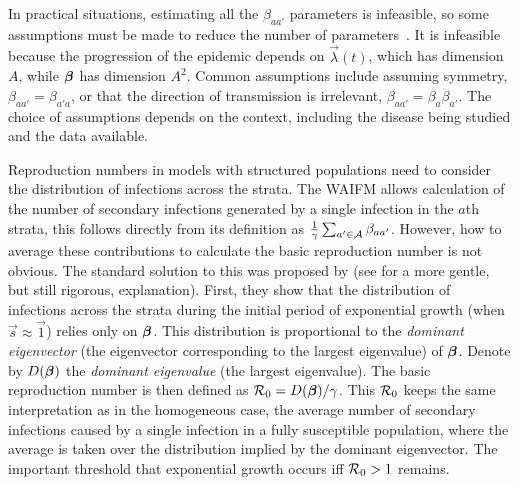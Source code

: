 \documentclass[thesis.tex]{subfiles}
\begin{document}
In practical situations, estimating all the $\beta_{aa'}$ parameters is infeasible, so some assumptions must be made to reduce the number of parameters~\autocite[176]{andersonInfectious}.
It is infeasible because the progression of the epidemic depends on $\vec{\lambda}(t)$, which has dimension $A$, while $\bm{\beta}$ has dimension $A^2$.
Common assumptions include assuming symmetry, \ie $\beta_{aa'} = \beta_{a'a}$, or that the direction of transmission is irrelevant, \ie $\beta_{aa'} = \beta_{a} \beta_{a'}$.
The choice of assumptions depends on the context, including the disease being studied and the data available.

Reproduction numbers in models with structured populations need to consider the distribution of infections across the strata.
The WAIFM allows calculation of the number of secondary infections generated by a single infection in the $a$th strata,  this follows directly from its definition as $\frac{1}{\gamma} \sum_{a' \in \mathcal{A}} \beta_{aa'}$. 
However, how to average these contributions to calculate the basic reproduction number is not obvious.
The standard solution to this was proposed by \textcite{diekmannDefinition} (see \textcite[chapter 7]{diekmannMathematical} for a more gentle, but still rigorous, explanation).
First, they show that the distribution of infections across the strata during the initial period of exponential growth (when $\vec{s} \approx \vec{1}$) relies only on $\bm{\beta}$.
This distribution is proportional to the \emph{dominant eigenvector} (the eigenvector corresponding to the largest eigenvalue) of $\bm{\beta}$.
Denote by $D(\bm{\beta})$ the \emph{dominant eigenvalue} (the largest eigenvalue).
The basic reproduction number is then defined as $\mathcal{R}_{0} = D(\bm{\beta}) / \gamma$.
This $\mathcal{R}_{0}$ keeps the same interpretation as in the homogeneous case, \ie the average number of secondary infections caused by a single infection in a fully susceptible population, where the average is taken over the distribution implied by the dominant eigenvector.
The important threshold that exponential growth occurs iff $\mathcal{R}_{0} > 1$ remains.
\end{document}
